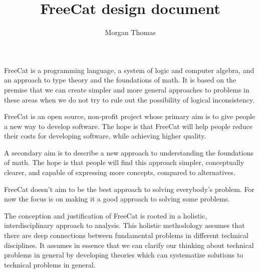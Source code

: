 \documentclass{article}
\title{FreeCat design document}
\author{Morgan Thomas}
\begin{document}
\maketitle

FreeCat is a programming language, a system of logic and computer algebra, and an approach to type theory and the foundations of math. It is based on the premise that we can create simpler and more general approaches to problems in these areas when we do not try to rule out the possibility of logical inconsistency.

FreeCat is an open source, non-profit project whose primary aim is to give people a new way to develop software. The hope is that FreeCat will help people reduce their costs for developing software, while achieving higher quality.

A secondary aim is to describe a new approach to understanding the foundations of math. The hope is that people will find this approach simpler, conceptually clearer, and capable of expressing more concepts, compared to alternatives.

FreeCat doesn't aim to be the best approach to solving everybody's problem. For now the focus is on making it a good approach to solving some problems.

The conception and justification of FreeCat is rooted in a holistic, interdisciplinary approach to analysis. This holistic methodology assumes that there are deep connections between fundamental problems in different technical disciplines. It assumes in essence that we can clarify our thinking about technical problems in general by developing theories which can systematize solutions to technical problems in general.
\end{document}

